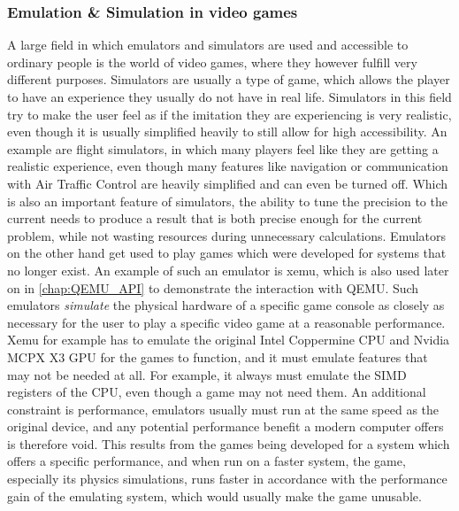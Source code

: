 \subsubsection*{Emulation \& Simulation in video games}
A large field in which emulators and simulators are used and accessible to ordinary people
is the world of video games,
where they however fulfill very different purposes.
Simulators are usually a type of game,
which allows the player to have an experience they usually do not have in real life.
Simulators in this field try to make the user feel as if the imitation they are experiencing is very realistic,
even though it is usually simplified heavily to still allow for high accessibility.
An example are flight simulators, in which many players feel like they are getting a realistic experience,
even though many features like navigation or communication with Air Traffic Control are heavily simplified
and can even be turned off.
Which is also an important feature of simulators, the ability to tune the precision
to the current needs to produce a result that is both precise enough for the current problem,
while not wasting resources during unnecessary calculations.\linebreak
Emulators on the other hand get used to play games which were developed for systems that no longer exist.
An example of such an emulator is xemu\cite{xemu},
which is also used later on in \autoref{chap:QEMU_API} to demonstrate the interaction with QEMU.
Such emulators \emph{simulate} the physical hardware of a specific game console
as closely as necessary for the user to play a specific video game at a reasonable performance.
Xemu for example has to emulate the original Intel Coppermine CPU and Nvidia MCPX X3 GPU
for the games to function, and it must emulate features that may not be needed at all.
For example, it always must emulate the SIMD registers of the CPU, even though a game may not need them.
An additional constraint is performance, emulators usually must run at the same speed as the original device,
and any potential performance benefit a modern computer offers is therefore void.
This results from the games being developed for a system which offers a specific performance,
and when run on a faster system, the game, especially its physics simulations,
runs faster in accordance with the performance gain of the emulating system,
which would usually make the game unusable.

